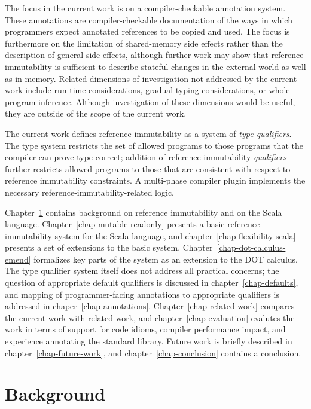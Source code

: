 \documentclass[11pt]{report}
\begin{document}
The focus in the current work is on a compiler-checkable annotation system.
These annotations are compiler-checkable documentation of the ways in which programmers
expect annotated references to be copied and used.
The focus is furthermore on the limitation of shared-memory side effects
rather than the description of general side effects, although further work
may show that reference immutability is sufficient to describe stateful changes
in the external world as well as in memory.
Related dimensions of investigation not addressed by the current work
include run-time considerations, gradual typing considerations,
or whole-program inference.
Although investigation of these dimensions would be useful,
they are outside of the scope of the current work.

The current work defines reference immutability as a system of {\em type qualifiers}.
The type system restricts the set of allowed programs to those programs that
the compiler can prove type-correct; addition of reference-immutability {\em qualifiers}
further restricts allowed programs to those that are consistent with respect to
reference immutability constraints.
A multi-phase compiler plugin implements the necessary reference-immutability-related logic.

Chapter~\ref{chap-background} contains background on reference immutability and
on the Scala language.
Chapter~\ref{chap-mutable-readonly} presents a basic reference immutability system
for the Scala language, and chapter~\ref{chap-flexibility-scala} presents a set of
extensions to the basic system.
Chapter~\ref{chap-dot-calculus-emend} formalizes key parts of the system
as an extension to the DOT calculus.
The type qualifier system itself does not address all practical concerns;
the question of appropriate default qualifiers is discussed in chapter~\ref{chap-defaults},
and mapping of programmer-facing annotations to appropriate qualifiers is
addressed in chaper~\ref{chap-annotations}.
Chapter~\ref{chap-related-work} compares the current work with related work,
and chapter~\ref{chap-evaluation} evalutes the work in terms of support for
code idioms, compiler performance impact, and experience annotating
the standard library.
Future work is briefly described in chapter~\ref{chap-future-work},
and chapter~\ref{chap-conclusion} contains a conclusion.

\chapter{Background} \label{chap-background}
	
\end{document}
